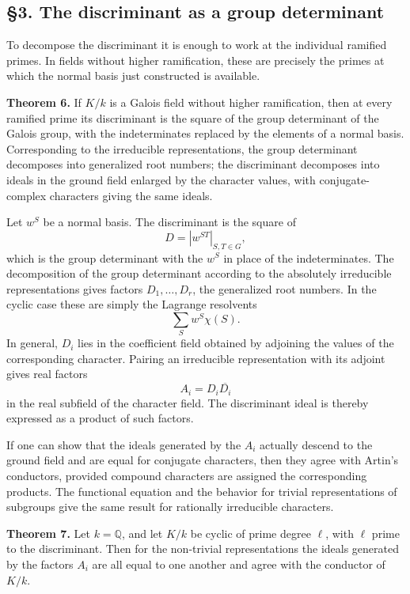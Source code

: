 \documentclass[
  11pt,
]{article}
\begin{document}
\subsection{§3. The discriminant as a group
determinant}\label{the-discriminant-as-a-group-determinant}

To decompose the discriminant it is enough to work at the individual
ramified primes. In fields without higher ramification, these are
precisely the primes at which the normal basis just constructed is
available.

\textbf{Theorem 6.} If \(K/k\) is a Galois field without higher
ramification, then at every ramified prime its discriminant is the
square of the group determinant of the Galois group, with the
indeterminates replaced by the elements of a normal basis. Corresponding
to the irreducible representations, the group determinant decomposes
into generalized root numbers; the discriminant decomposes into ideals
in the ground field enlarged by the character values, with
conjugate-complex characters giving the same ideals.

Let \(w^S\) be a normal basis. The discriminant is the square of \[
  D=|w^{ST}|_{S,T\in G},
\] which is the group determinant with the \(w^S\) in place of the
indeterminates. The decomposition of the group determinant according to
the absolutely irreducible representations gives factors \(D_1,
\ldots,D_r\), the generalized root numbers. In the cyclic case these are
simply the Lagrange resolvents \[
  \sum_S w^S \chi(S).
\] In general, \(D_i\) lies in the coefficient field obtained by
adjoining the values of the corresponding character. Pairing an
irreducible representation with its adjoint gives real factors \[
  A_i=D_i\overline{D_i}
\] in the real subfield of the character field. The discriminant ideal
is thereby expressed as a product of such factors.

If one can show that the ideals generated by the \(A_i\) actually
descend to the ground field and are equal for conjugate characters, then
they agree with Artin's conductors, provided compound characters are
assigned the corresponding products. The functional equation and the
behavior for trivial representations of subgroups give the same result
for rationally irreducible characters.

\textbf{Theorem 7.} Let \(k=\mathbb Q\), and let \(K/k\) be cyclic of
prime degree \(\ell\), with \(\ell\) prime to the discriminant. Then for
the non-trivial representations the ideals generated by the factors
\(A_i\) are all equal to one another and agree with the conductor of
\(K/k\).
\end{document}
